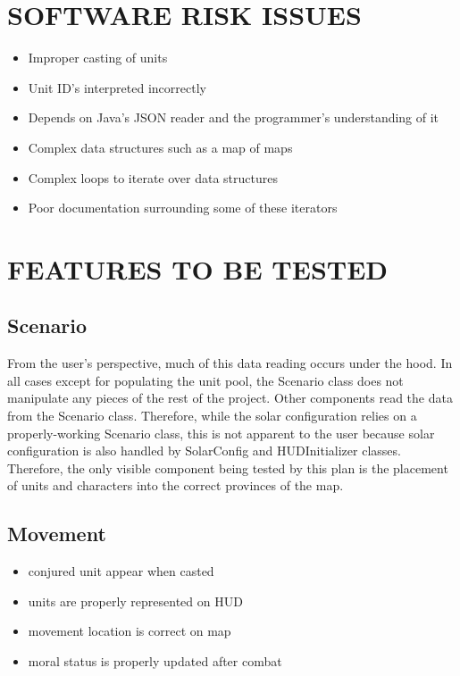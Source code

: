 \section[SOFTWARE RISK ISSUES]{\bfseries\color{black} SOFTWARE RISK ISSUES}
{\color{black}

{\color{black}
\begin{itemize}
\item Improper casting of units
\item Unit ID's interpreted incorrectly
\item Depends on Java's JSON reader and the programmer's understanding of it
\item Complex data structures such as a map of maps
\item Complex loops to iterate over data structures
\item Poor documentation surrounding some of these iterators
\end{itemize}
}

\section[FEATURES TO BE TESTED]{\bfseries\color{black} FEATURES TO BE TESTED}

{\color{black}
\subsection{Scenario}
From the user's perspective, much of this data reading occurs under the hood. 
In all cases except for populating the unit pool, the Scenario class does not 
manipulate any pieces of the rest of the project. Other components read the 
data from the Scenario class. Therefore, while the solar configuration relies 
on a properly-working Scenario class, this is not apparent to the user because 
solar configuration is also handled by SolarConfig and HUDInitializer classes.
\newline
\newline
Therefore, the only visible component being tested by this plan is the placement 
of units and characters into the correct provinces of the map.

\subsection{Movement}

\begin{itemize}
\item conjured unit appear when casted
\item units are properly represented on HUD
\item movement location is correct on map
\item moral status is properly updated after combat
\end{itemize}

}}
